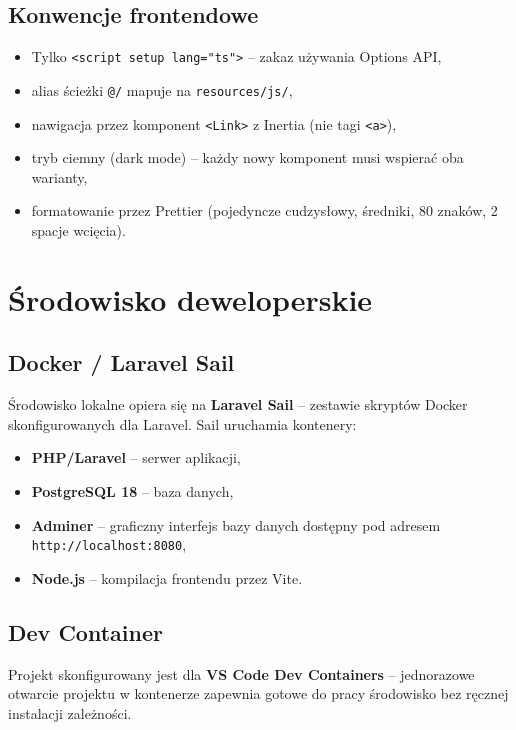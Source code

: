 \documentclass[12pt,a4paper]{report}
\begin{document}
\subsection{Konwencje frontendowe}

\begin{itemize}[noitemsep]
    \item Tylko \texttt{<script setup lang="ts">} -- zakaz używania Options API,
    \item alias ścieżki \texttt{@/} mapuje na \texttt{resources/js/},
    \item nawigacja przez komponent \texttt{<Link>} z Inertia (nie tagi \texttt{<a>}),
    \item tryb ciemny (dark mode) -- każdy nowy komponent musi wspierać oba warianty,
    \item formatowanie przez Prettier (pojedyncze cudzysłowy, średniki, 80 znaków, 2 spacje wcięcia).
\end{itemize}

\section{Środowisko deweloperskie}

\subsection{Docker / Laravel Sail}

Środowisko lokalne opiera się na \textbf{Laravel Sail} -- zestawie skryptów Docker skonfigurowanych dla Laravel. Sail uruchamia kontenery:
\begin{itemize}[noitemsep]
    \item \textbf{PHP/Laravel} -- serwer aplikacji,
    \item \textbf{PostgreSQL 18} -- baza danych,
    \item \textbf{Adminer} -- graficzny interfejs bazy danych dostępny pod adresem \texttt{http://localhost:8080},
    \item \textbf{Node.js} -- kompilacja frontendu przez Vite.
\end{itemize}

\subsection{Dev Container}

Projekt skonfigurowany jest dla \textbf{VS Code Dev Containers} -- jednorazowe otwarcie projektu w kontenerze zapewnia gotowe do pracy środowisko bez ręcznej instalacji zależności.
\end{document}
